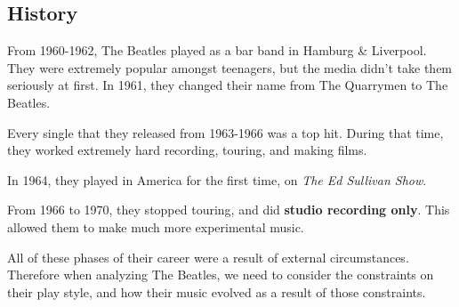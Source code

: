 \documentclass[class=article, crop=false]{standalone}
\begin{document}
\subsection{History}
From 1960-1962, The Beatles played as a bar band in Hamburg \& Liverpool. They were extremely popular amongst teenagers, but the media didn't take them seriously at first. In 1961, they changed their name from The Quarrymen to The Beatles.
\par
Every single that they released from 1963-1966 was a top hit. During that time, they worked extremely hard recording, touring, and making films.
\par
In 1964, they played in America for the first time, on \emph{The Ed Sullivan Show}.
\par
From 1966 to 1970, they stopped touring, and did \textbf{studio recording only}. This allowed them to make much more experimental music.
\par
All of these phases of their career were a result of external circumstances. Therefore when analyzing The Beatles, we need to consider the constraints on their play style, and how their music evolved as a result of those constraints.
\end{document}
